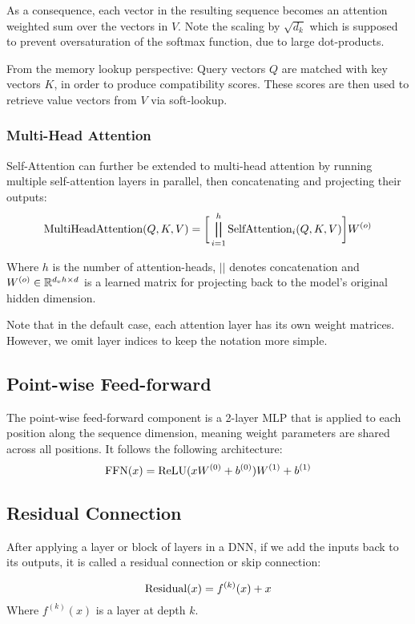 As a consequence, each vector in the resulting sequence becomes an attention weighted sum over the vectors in $V$. Note the scaling by $\sqrt{d_k}$ which is supposed to prevent oversaturation of the softmax function, due to large dot-products.

From the memory lookup perspective: Query vectors $Q$ are matched with key vectors $K$, in order to produce compatibility scores. These scores are then used to retrieve value vectors from $V$ via soft-lookup.

\subsubsection{Multi-Head Attention}
Self-Attention can further be extended to multi-head attention by running multiple self-attention layers in parallel, then concatenating and projecting their outputs:
\begin{equation}
    \text{MultiHeadAttention}(Q, K, V) = \bigg[ \bigparallel_{i=1}^h \text{SelfAttention}_i(Q,K,V) \bigg] W^{(o)}
\end{equation}

Where $h$ is the number of attention-heads, $||$ denotes concatenation and $W^{(o)} \in \mathbb{R}^{d_v h \times d}$ is a learned matrix for projecting back to the model's original hidden dimension.

Note that in the default case, each attention layer has its own weight matrices. However,  we omit layer indices to keep the notation more simple.

\subsection{Point-wise Feed-forward}
The point-wise feed-forward component is a 2-layer MLP that is applied to each position along the sequence dimension, meaning weight parameters are shared across all positions. It follows the following architecture:
\begin{equation}
    \text{FFN}(x) = \text{ReLU}(x W^{(0)} + b^{(0)}) W^{(1)} + b^{(1)}
\end{equation}

\subsection{Residual Connection}
After applying a layer or block of layers in a DNN, if we add the inputs back to its outputs, it is called a residual connection or skip connection:

\begin{equation}
    \text{Residual}(x) = f^{(k)}(x) + x
\end{equation}
Where $f^{(k)}(x)$ is a layer at depth $k$.

